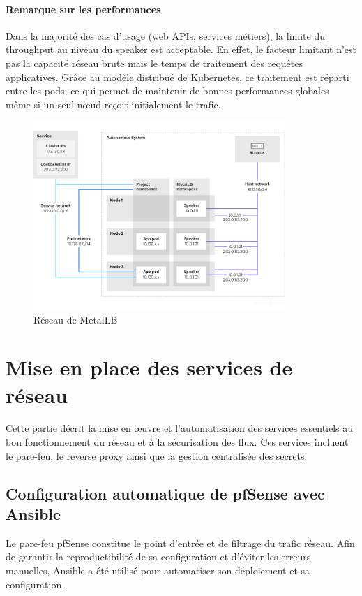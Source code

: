 \paragraph{Remarque sur les performances}

Dans la majorité des cas d’usage (web APIs, services métiers), la limite du throughput au niveau du speaker est acceptable. En effet, le facteur limitant n’est pas la capacité réseau brute mais le temps de traitement des requêtes applicatives. Grâce au modèle distribué de Kubernetes, ce traitement est réparti entre les pods, ce qui permet de maintenir de bonnes performances globales même si un seul nœud reçoit initialement le trafic.

\begin{figure}[H]
	\centering
	\includegraphics[width=0.85\textwidth]{figures/Metallb network.png}
	\caption{Réseau de MetalLB}
\end{figure}

\section{Mise en place des services de réseau}

Cette partie décrit la mise en œuvre et l’automatisation des services essentiels au bon fonctionnement du réseau et à la sécurisation des flux. Ces services incluent le pare-feu, le reverse proxy ainsi que la gestion centralisée des secrets.

\subsection{Configuration automatique de pfSense avec Ansible}

Le pare-feu pfSense constitue le point d’entrée et de filtrage du trafic réseau. Afin de garantir la reproductibilité de sa configuration et d’éviter les erreurs manuelles, Ansible a été utilisé pour automatiser son déploiement et sa configuration.

